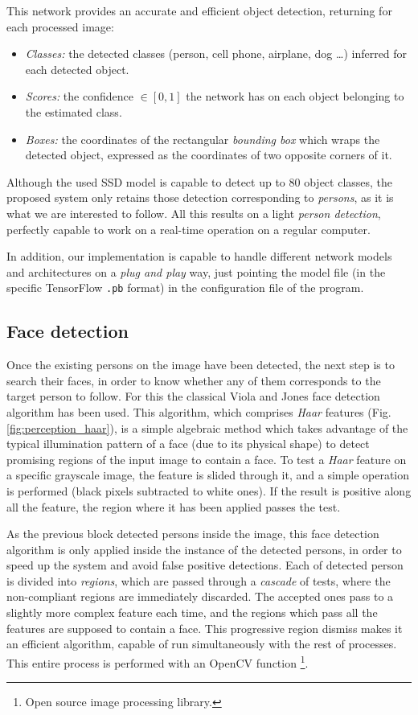 This network provides an accurate and efficient object detection, returning for each processed image:
\begin{itemize}
	\item \emph{Classes:} the detected classes (person, cell phone, airplane, dog \dots) inferred for each detected object.
	\item \emph{Scores:} the confidence $\in [0,1]$ the network has on each object belonging to the estimated class.
	\item \emph{Boxes:} the coordinates of the rectangular \emph{bounding box} which wraps the detected object, expressed as the coordinates of two opposite corners of it.
\end{itemize}

Although the used SSD model is capable to detect up to 80 object classes, the proposed system only retains those detection corresponding to \emph{persons}, as it is what we are interested to follow. All this results on a light \emph{person detection}, perfectly capable to work on a real-time operation on a regular computer. 

In addition, our implementation is capable to handle different network models and architectures on a \emph{plug and play} way, just pointing the model file (in the specific TensorFlow \texttt{.pb} format) in the configuration file of the program.


\subsection{Face detection}

Once the existing persons on the image have been detected, the next step is to search their faces, in order to know whether any of them corresponds to the target person to follow. For this the classical Viola and Jones face detection algorithm \cite{viola-jones} has been used. This algorithm, which comprises \emph{Haar} features (Fig. \ref{fig:perception_haar}), is a simple algebraic method which takes advantage of the typical illumination pattern of a face (due to its physical shape) to detect promising regions of the input image to contain a face. To test a \emph{Haar} feature on a specific grayscale image, the feature is slided through it, and a simple operation is performed (black pixels subtracted to white ones). If the result is positive along all the feature, the region where it has been applied passes the test.


As the previous block detected persons inside the image, this face detection algorithm is only applied inside the instance of the detected persons, in order to speed up the system and avoid false positive detections. Each of detected person is divided into \emph{regions}, which are passed through a \emph{cascade} of tests, where the non-compliant regions are immediately discarded. The accepted ones pass to a slightly more complex feature each time, and the regions which pass all the features are supposed to contain a face. This progressive region dismiss makes it an efficient algorithm, capable of run simultaneously with the rest of processes. This entire process is performed with an OpenCV function \footnote{Open source image processing library.}.


